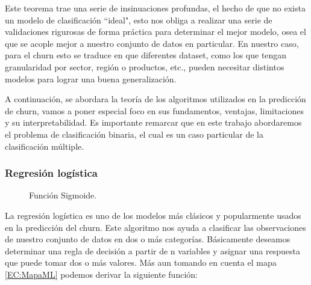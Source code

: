 Este teorema trae una serie de insinuaciones profundas, el hecho de que no exista un modelo de clasificación ``ideal", esto nos obliga a realizar una serie de validaciones rigurosas de forma práctica para determinar el mejor modelo, osea el que se acople mejor a nuestro conjunto de datos en particular. En nuestro caso, para el churn esto se traduce en que diferentes dataset, como los que tengan granularidad por sector, región o productos, etc., pueden necesitar distintos modelos para lograr una buena generalización.


A continuación, se abordara la teoría de los algoritmos utilizados en la predicción de churn, vamos a poner especial foco en sus fundamentos, ventajas, limitaciones y su interpretabilidad. Es importante remarcar que en este trabajo abordaremos el problema de clasificación binaria, el cual es un caso particular de la clasificación múltiple.

\newpage

\subsubsection{Regresión logística}

\begin{figure}
	\centering
	\caption{Función Sigmoide.}
	\label{fig:sigmoide-wrap}
\end{figure}

La regresión logística es uno de los modelos más clásicos y popularmente usados en la predicción del churn. Este algoritmo nos ayuda a clasificar las observaciones de nuestro conjunto de datos en dos o más categorías. Básicamente deseamos determinar una regla de decisión a partir de n variables y asignar una respuesta que puede tomar dos o más valores. Más aun tomando en cuenta el mapa \eqref{EC:MapaML} podemos derivar la siguiente función:

